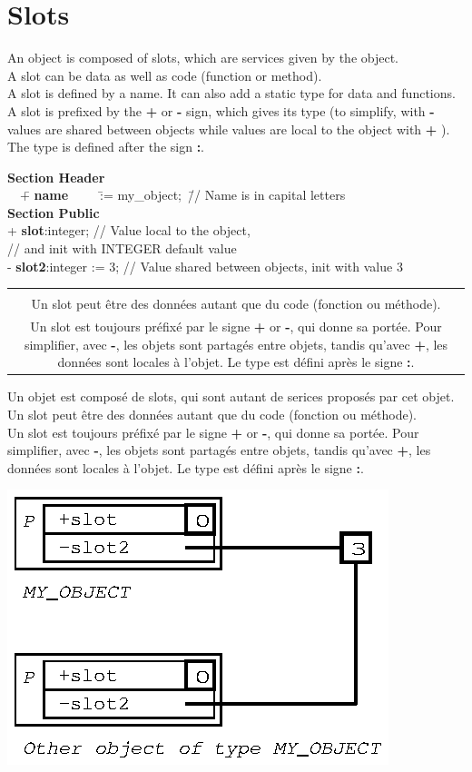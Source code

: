 \documentclass[11pt]{mybook}
\newcommand{\fr}[1]{
  \if \frenchversion 1
    \if \englishversion 1    
    \vspace{2mm}
    \noindent\begin{tabular}{|c}
      {
        \begin{minipage}{15.5cm}
          \textit{#1}
        \end{minipage}
      }
    \end{tabular}
    \else
    #1
    \fi
  \fi
}
\newcommand{\en}[1]
{
  \if \englishversion 1
  #1
  \fi
}
\begin{document}
\section{Slots}
\label{quickstart:slots}
%
\en{An object is composed of slots, which are services given by the object.\\
A slot can be data as well as code (function or method).\\
A slot is defined by a name. It can also add a static type for data and functions.\\
A slot is prefixed by the {\bf{} +} or {\bf{} -} sign, which gives its type (to simplify, with {\bf{} -} values are shared between objects while values are local to the object with {\bf{} +} ).\\
The type is defined after the sign {\bf{} :}.

{\tt\begin{tabbing}
{\bf{}Section Header}\\
~~\=+ {\bf{}name}~~~~~\=:= {\sc{}my\_object};~\=// Name is in capital letters \\
{\bf{}Section Public}\\
  \>+ {\bf{}slot}:{\sc{}integer};      \>     \>// Value local to the object, \\
  \>                                   \>     \>// and init with INTEGER default value \\
  \>- {\bf{}slot2}:{\sc{}integer} := 3;\>     \>// Value shared between objects, init with value 3\\
\end{tabbing}}
}
\fr{
Un objet est compos\'e de slots, qui sont autant de serices propos\'es par cet objet.\\
Un slot peut \^etre des donn\'ees autant que du code (fonction ou m\'ethode).\\
Un slot est toujours pr\'efix\'e par le signe {\bf{} +} or {\bf{} -}, qui donne sa port\'ee. 
Pour simplifier, avec {\bf{} -}, les objets sont partag\'es entre objets, tandis qu'avec {\bf{} +}, 
les donn\'ees sont locales \`a l'objet.
Le type est défini après le signe {\bf{} :}.
}

\begin{center}
\includegraphics[scale=1.0]{figures/slot_minus_plus}
\end{center}
\end{document}
